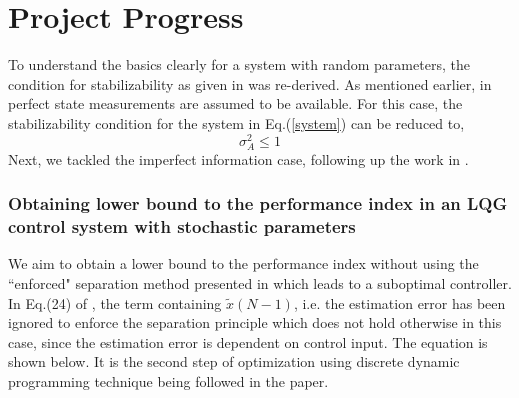 \documentclass[12pt]{caltech_thesis_progress1}
\begin{document}
\chapter{Project Progress}
To understand the basics clearly for a system with random parameters, the condition for stabilizability as given in \cite{utp} was re-derived. As mentioned earlier, in \cite{utp} perfect state measurements are assumed to be available. For this case, the stabilizability condition for the system in Eq.(\ref{system}) can be reduced to,
		\begin{equation}
			\sigma_{A}^{2} \leq 1
		\end{equation}	
		Next, we tackled the imperfect information case, following up the work in \cite{samir}.	 
\subsection{Obtaining lower bound to  the performance index in an LQG control system with stochastic parameters}
We aim to obtain a lower bound to the performance index without using the ``enforced" separation method presented in \cite{samir} which leads to a suboptimal controller. In Eq.(24) of \cite{samir}, the term containing $\tilde{x}(N-1)$, i.e. the estimation error has been ignored to enforce the separation principle which does not hold otherwise in this case, since the estimation error is dependent on control input. The equation is shown below. It is the second step of optimization using discrete dynamic programming technique being followed in the paper.
\end{document}
